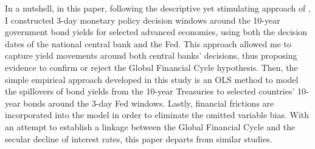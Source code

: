 In a nutshell, in this paper, following the descriptive yet stimulating approach of \citet{hillenbrand2022}, I constructed 3-day monetary policy decision windows around the 10-year government bond yields for selected advanced economies, using both the decision dates of the national central bank and the Fed. This approach allowed me to capture yield movements around both central banks' decisions, thus proposing evidence to confirm or reject the Global Financial Cycle hypothesis. Then, the simple empirical approach developed in this study is an OLS method to model the spillovers of bond yields from the 10-year Treasuries to selected countries' 10-year bonds around the 3-day Fed windows. Lastly, financial frictions are incorporated into the model in order to eliminate the omitted variable bias. With an attempt to establish a linkage between the Global Financial Cycle and the secular decline of interest rates, this paper departs from similar studies.
